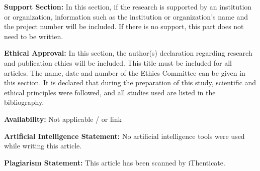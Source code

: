 \documentclass[final, 9pt, onecolumn]{saucis}
\begin{document}
\textbf{Support Section:}
In this section, if the research is supported by an institution or organization, information such as the institution or organization's name and the project number will be included. If there is no support, this part does not need to be written.\vspace{0.2cm}

\textbf{Ethical Approval:}
In this section, the author(s) declaration regarding research and publication ethics will be included. This title must be included for all articles. The name, date and number of the Ethics Committee can be given in this section.
It is declared that during the preparation of this study, scientific and ethical principles were followed, and all studies used are listed in the bibliography.
\vspace{0.2cm}

\textbf{Availability:}
Not applicable / or link
\vspace{0.2cm}

\textbf{Artificial Intelligence Statement:}
No artificial intelligence tools were used while writing this article. 
\vspace{0.2cm}

\textbf{Plagiarism Statement:}
This article has been scanned by iThenticate\texttrademark.
\vspace{0.2cm}
\end{document}

